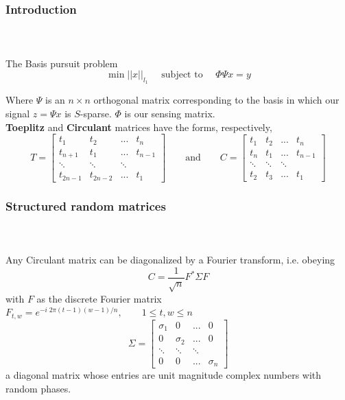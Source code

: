 
\begin{frame}[t]
	\frametitle{Introduction}
	\framesubtitle{~~}  %

	The Basis pursuit problem 
	\begin{equation}
		\min ||x||_{l_1} \quad \text{ subject to } \quad \Phi \Psi x=y
	\end{equation}

	\small
	Where $\Psi$ is an $n \times n$ orthogonal matrix corresponding to the basis in which our signal $z = \Psi x$ is $S$-sparse. $\Phi$ is our sensing matrix. 
	\\
	\normalfont
	\textbf{Toeplitz} and \textbf{Circulant} matrices have the forms, respectively,
	\\
	
	$$
	T = \begin{bmatrix}
		t_{1}    & t_{2}    & ...    & t_{n}   \\[0.3em]
		t_{n+1}  & t_{1}    & ...    & t_{n-1} \\[0.3em]
		\ddots   & \ddots   & \ddots &         \\[0.3em]
		t_{2n-1} & t_{2n-2} & ...    & t_{1}         
	\end{bmatrix}
	\qquad \text{and} \qquad
	C = \begin{bmatrix}
		t_{1}  & t_{2}  & ...    & t_{n}   \\[0.3em]
		t_{n}  & t_{1}  & ...    & t_{n-1} \\[0.3em]
		\ddots & \ddots & \ddots &         \\[0.3em]
		t_{2}  & t_{3}  & ...    & t_{1}        
	\end{bmatrix} 
	$$
\end{frame}
\begin{frame}[t]
	\frametitle{Structured random matrices}
	\framesubtitle{~~}  %
	Any Circulant matrix can be diagonalized by a Fourier transform, i.e. obeying
	$$ C=\frac{1}{\sqrt{n}} F^* \Sigma F $$ with $F$ as the discrete Fourier matrix
	$F_{t,w}=e^{-i\; 2\pi(t-1)(w-1)/n}, \qquad 1 \le t,w \le n$
	$$
	\Sigma = \begin{bmatrix}
		\sigma_{1} & 0 & ...& 0           \\[0.3em]
		0 & \sigma_{2} & ... & 0 \\[0.3em]
		\ddots &\ddots & \ddots &      \\[0.3em]
		0 & 0 & ... & \sigma_{n}        
	\end{bmatrix} $$
	a diagonal matrix whose entries are unit magnitude complex numbers with random phases.
\end{frame}


